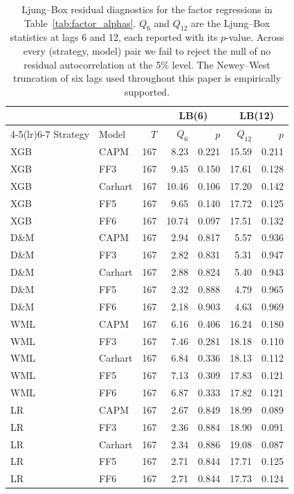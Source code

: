 \begin{table}[H]
\centering
\small
\begin{tabular}{l l r r r r r}
\toprule
 &  &  & \multicolumn{2}{c}{LB(6)} & \multicolumn{2}{c}{LB(12)} \\
\cmidrule(lr){4-5}\cmidrule(lr){6-7}
Strategy & Model & $T$ & $Q_6$ & $p$ & $Q_{12}$ & $p$ \\
\midrule
XGB & CAPM & 167 & 8.23 & 0.221 & 15.59 & 0.211 \\
XGB & FF3 & 167 & 9.45 & 0.150 & 17.61 & 0.128 \\
XGB & Carhart & 167 & 10.46 & 0.106 & 17.20 & 0.142 \\
XGB & FF5 & 167 & 9.65 & 0.140 & 17.72 & 0.125 \\
XGB & FF6 & 167 & 10.74 & 0.097 & 17.51 & 0.132 \\
D\&M & CAPM & 167 & 2.94 & 0.817 & 5.57 & 0.936 \\
D\&M & FF3 & 167 & 2.82 & 0.831 & 5.31 & 0.947 \\
D\&M & Carhart & 167 & 2.88 & 0.824 & 5.40 & 0.943 \\
D\&M & FF5 & 167 & 2.32 & 0.888 & 4.79 & 0.965 \\
D\&M & FF6 & 167 & 2.18 & 0.903 & 4.63 & 0.969 \\
WML & CAPM & 167 & 6.16 & 0.406 & 16.24 & 0.180 \\
WML & FF3 & 167 & 7.46 & 0.281 & 18.18 & 0.110 \\
WML & Carhart & 167 & 6.84 & 0.336 & 18.13 & 0.112 \\
WML & FF5 & 167 & 7.13 & 0.309 & 17.83 & 0.121 \\
WML & FF6 & 167 & 6.87 & 0.333 & 17.82 & 0.121 \\
LR & CAPM & 167 & 2.67 & 0.849 & 18.99 & 0.089 \\
LR & FF3 & 167 & 2.36 & 0.884 & 18.90 & 0.091 \\
LR & Carhart & 167 & 2.34 & 0.886 & 19.08 & 0.087 \\
LR & FF5 & 167 & 2.71 & 0.844 & 17.71 & 0.125 \\
LR & FF6 & 167 & 2.71 & 0.844 & 17.73 & 0.124 \\
\bottomrule
\end{tabular}
\caption{Ljung--Box residual diagnostics for the factor regressions in Table~\ref{tab:factor_alphas}. $Q_6$ and $Q_{12}$ are the Ljung--Box statistics at lags 6 and 12, each reported with its $p$-value. Across every (strategy, model) pair we fail to reject the null of no residual autocorrelation at the 5\% level. The Newey--West truncation of six lags used throughout this paper is empirically supported.}
\label{tab:residual_diagnostics}
\end{table}
